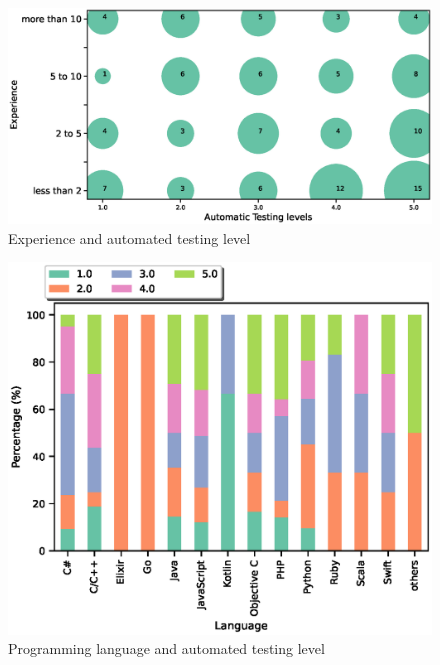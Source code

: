 \begin{figure}[h]
\centering
  \includegraphics[scale=0.45]{Figures/Auto_Test_and_Experience}
  \caption{Experience and automated testing level}
  \label{fig:experience and autotest}
\end{figure}
\begin{figure}[h]
\centering
  \includegraphics[scale=0.65]{Figures/Language_and_Test_Level}
  \caption{Programming language and automated testing level}
  \label{fig:language and autotest}
\end{figure}

